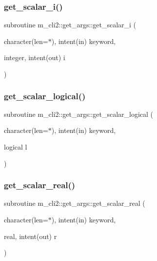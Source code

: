 \subsubsection{\texorpdfstring{get\+\_\+scalar\+\_\+i()}{get\_scalar\_i()}}
{\footnotesize\ttfamily subroutine m\+\_\+cli2\+::get\+\_\+args\+::get\+\_\+scalar\+\_\+i (\begin{DoxyParamCaption}\item[{character(len=$\ast$), intent(in)}]{keyword,  }\item[{integer, intent(out)}]{i }\end{DoxyParamCaption})\hspace{0.3cm}{\ttfamily [private]}}

\mbox{\label{interfacem__cli2_1_1get__args_a067f9a7dd7edb825afb728f069b3233e}} 
\subsubsection{\texorpdfstring{get\+\_\+scalar\+\_\+logical()}{get\_scalar\_logical()}}
{\footnotesize\ttfamily subroutine m\+\_\+cli2\+::get\+\_\+args\+::get\+\_\+scalar\+\_\+logical (\begin{DoxyParamCaption}\item[{character(len=$\ast$), intent(in)}]{keyword,  }\item[{logical}]{l }\end{DoxyParamCaption})\hspace{0.3cm}{\ttfamily [private]}}

\mbox{\label{interfacem__cli2_1_1get__args_aa6f39c9132687c0396d3b054bc5e47f6}} 
\subsubsection{\texorpdfstring{get\+\_\+scalar\+\_\+real()}{get\_scalar\_real()}}
{\footnotesize\ttfamily subroutine m\+\_\+cli2\+::get\+\_\+args\+::get\+\_\+scalar\+\_\+real (\begin{DoxyParamCaption}\item[{character(len=$\ast$), intent(in)}]{keyword,  }\item[{real, intent(out)}]{r }\end{DoxyParamCaption})\hspace{0.3cm}{\ttfamily [private]}}

